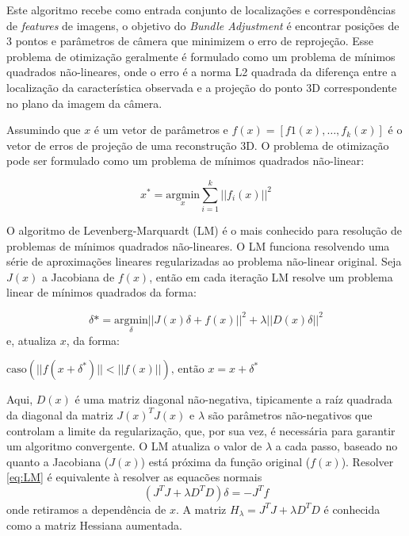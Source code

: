 \begin{itemize}
Este algoritmo recebe como entrada conjunto de localizações e correspondências de \emph{features} de imagens, o objetivo do \emph{Bundle Adjustment} é encontrar posições de 3 pontos e parâmetros de câmera que minimizem o erro de reprojeção. Esse problema de otimização geralmente é formulado como um problema de mínimos quadrados não-lineares, onde o erro é a norma L2 quadrada da diferença entre a localização da característica observada e a projeção do ponto 3D correspondente no plano da imagem da câmera.

Assumindo que $x$ é um vetor de parâmetros e $f(x) = [f1(x), \dots, f_k(x)]$ é o vetor de erros de projeção de uma reconstrução 3D. O problema de otimização pode ser  formulado como um problema de mínimos quadrados não-linear:

\begin{equation}
x^* = \underset{x}{\text{argmin}} \sum_{i=1}^k || f_i(x)||^2
\end{equation}

O algoritmo de Levenberg-Marquardt (LM) é o mais conhecido para resolução de problemas de mínimos quadrados não-lineares. O LM funciona resolvendo uma série de aproximações lineares regularizadas ao problema não-linear original. Seja $J(x)$ a Jacobiana de $f(x)$, então em cada iteração LM resolve um problema linear de mínimos quadrados da forma:

\begin{equation}
\label{eq:LM}
\delta* = \underset{\delta}{\text{argmin}} || J(x)\delta + f(x) ||^2 + \lambda ||D(x)\delta||^2 
\end{equation}
e, atualiza $x$, da forma:

\begin{algorithm}
\label{LMattX}
\begin{algorithmic}[1]
\State $\text{caso} (||f(x + \delta^*)|| < || f(x) ||) \text{, então}$
\State	 $x = x + \delta^*$
\end{algorithmic}
\end{algorithm}


Aqui, $D(x)$ é uma matriz diagonal não-negativa, tipicamente a raíz quadrada da diagonal da matriz $J(x)^T J(x)$ e $\lambda$ são parâmetros não-negativos que controlam a limite da regularização, que, por sua vez, é necessária para garantir um algoritmo convergente. O LM atualiza o valor de $\lambda$ a cada passo, baseado no quanto a Jacobiana ($J(x)$) está próxima da função original ($f(x)$).
Resolver \ref{eq:LM} é equivalente à resolver as equacões normais
\begin{equation}
\label{eq:LMNormal}
(J^T J + \lambda D^T D)\delta = -J^T f
\end{equation}
onde retiramos a dependência de $x$. A matriz $H_\lambda = J^T J + \lambda D^T D$ é conhecida como a matriz Hessiana aumentada. 


\end{itemize}
